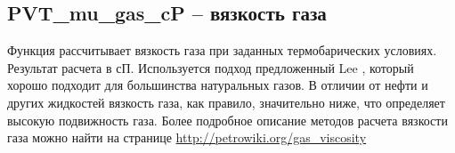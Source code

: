 
\newcommand{\MuDataFile}{data/Muo_P_data.txt}

\subsection{PVT\_mu\_gas\_cP – вязкость газа}

Функция рассчитывает вязкость газа при заданных термобарических условиях. Результат расчета в сП.  Используется подход предложенный Lee  \cite{Lee_1966}, который хорошо подходит для большинства натуральных газов. 
В отличии от нефти и других жидкостей вязкость газа, как правило, значительно ниже, что определяет высокую подвижность газа. 
Более подробное описание методов расчета вязкости газа можно найти на странице  \href{http://petrowiki.org/Gas_viscosity}{http://petrowiki.org/gas\_viscosity}



